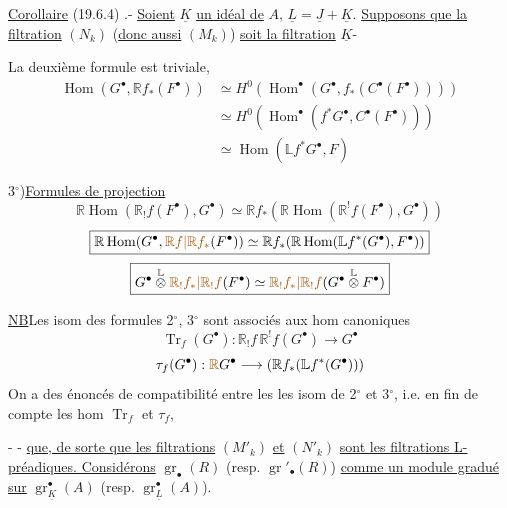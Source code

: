 \uline{Corollaire} (19.6.4) .- \uline{Soient} $\underline K$ \uline{un idéal de} $A$,
$\underline L=\underline J+\underline K$. \uline{Supposons
que la filtration} $(N_k)$ (\uline{donc aussi} $(M_k)$)
\uline{soit la filtration} $\underline K$-\uline{}

 La deuxième formule est triviale,
\[
\begin{aligned}
\operatorname{Hom}(G^\bullet,\mathbb{R}f_*(F^\bullet))
 &\simeq H^0(\operatorname{Hom}^\bullet(G^\bullet,f_*(C^\bullet(F^\bullet))))\\
 &\simeq H^0(\operatorname{Hom}^\bullet(f^*G^\bullet,C^\bullet(F^\bullet)))\\
 &\simeq\operatorname{Hom}(\mathbb{L}f^*G^\bullet,F)
\end{aligned}
\]

3$^\circ$)\quad \uline{Formules de projection}
\[
\boxed{\mathbb{R}\operatorname{Hom}(\mathbb{R}_!f(F^\bullet),G^\bullet)
 \simeq \mathbb{R}f_*(\mathbb{R}\operatorname{Hom}(\mathbb{R}^!f(F^\bullet),G^\bullet))}
\]
\[
\boxed{\mathbb{R}\operatorname{Hom}(G^\bullet,\unsure{\mathbb{R}f|\mathbb{R}f_*}(F^\bullet))
 \simeq \mathbb{R}f_*(\mathbb{R}\operatorname{Hom}(\mathbb{L}f^*(G^\bullet),F^\bullet))}
\]
\[
\boxed{G^\bullet\overset{\mathbb{L}}{\otimes}\unsure{\mathbb{R}_{\deleted{\unsure{!}}}f_*|\mathbb{R}_!f}(F^\bullet)
 \simeq\unsure{\mathbb{R}_{\deleted{\unsure{!}}}f_*|\mathbb{R}_!f}
 (G^\bullet\overset{\mathbb{L}}{\otimes}F^\bullet)}
\]

\uline{NB}\quad Les  isom des formules 2$^\circ$, 3$^\circ$
sont associés aux hom canoniques
\[
\operatorname{Tr}_f(G^\bullet):
 \mathbb{R}_!f\,\mathbb{R}^!f(G^\bullet)\longrightarrow G^\bullet
\]
\[
\tau_f(G^\bullet):
 \deleted{\unsure{\mathbb{R}}}G^\bullet\longrightarrow(\mathbb{R}f_*(\mathbb{L}f^*(G^\bullet)))
\]
On a des énoncés de compatibilité
entre les les isom de 2$^\circ$ et 3$^\circ$, i.e. en
fin de compte les hom $\operatorname{Tr}_f$ et $\tau_f$,

-  -
\uline{que, de sorte que les filtrations} $(M'_k)$ \uline{et} $(N'_k)$ \uline{sont les filtrations
L-préadiques. Considérons} $\operatorname{gr}_\bullet(R)$ (resp. $\operatorname{gr}'_\bullet(R)$)
\uline{comme un module gradué sur} $\operatorname{gr}_{\underline K}^\bullet(A)$
(resp. $\operatorname{gr}_{\underline L}^\bullet(A)$).

